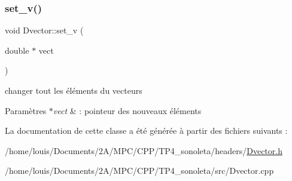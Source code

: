 \subsubsection{\texorpdfstring{set\+\_\+v()}{set\_v()}}
{\footnotesize\ttfamily void Dvector\+::set\+\_\+v (\begin{DoxyParamCaption}\item[{double $\ast$}]{vect }\end{DoxyParamCaption})}



changer tout les éléments du vecteurs 


\begin{DoxyParams}{Paramètres}
{\em $\ast$vect} & \+: pointeur des nouveaux éléments \\
\hline
\end{DoxyParams}


La documentation de cette classe a été générée à partir des fichiers suivants \+:\begin{DoxyCompactItemize}
\item 
/home/louis/\+Documents/2\+A/\+M\+P\+C/\+C\+P\+P/\+T\+P4\+\_\+sonoleta/headers/\hyperlink{_dvector_8h}{Dvector.\+h}\item 
/home/louis/\+Documents/2\+A/\+M\+P\+C/\+C\+P\+P/\+T\+P4\+\_\+sonoleta/src/Dvector.\+cpp\end{DoxyCompactItemize}
